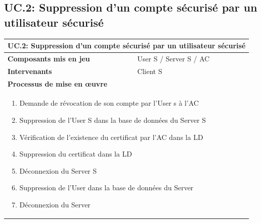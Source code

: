 \documentclass[a4paper,11pt,french]{article}
\begin{document}
\subsection{UC.2: Suppression d'un compte sécurisé par un utilisateur sécurisé}
\begin{center}
	\vspace*{0.7cm}
	\begin{tabularx}{16cm}{|l|X|}
	\hline
	\multicolumn{2}{|l|}{\textbf{UC.2: Suppression d'un compte sécurisé par un utilisateur sécurisé}}\\
	\hline
	\textbf{Composants mis en jeu} &  User S / Server S / AC \\
	\hline
	\textbf{Intervenants} & Client S\\
	\hline
	\multicolumn{2}{|l|}{\textbf{Processus de mise en \oe uvre}}\\
	\hline
	\multicolumn{2}{|p{15cm}|}{\begin{enumerate}\item Demande de révocation de son compte par l'User s à l'AC \item Suppression de l'User S dans la base de données du Server S \item Vérification de l'existence du certificat par l'AC dans la LD \item Suppression du certificat dans la LD \item Déconnexion du Server S \item Suppression de l'User  dans la base de données du Server\item Déconnexion du Server \end{enumerate}}\\
	\hline
	\end{tabularx}
\end{center}
\vspace{2cm}
\end{document}
